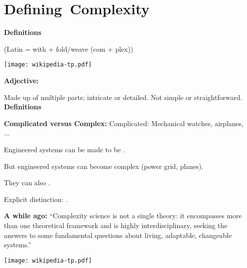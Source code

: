 

\section{Defining\ Complexity}
  \textbf{Definitions}

   (Latin = with + fold/weave (com + plex))
  \hfill
  
\begin{marginfigure}[]
\texttt{[image: wikipedia-tp.pdf]}
\end{marginfigure}


  \medskip

  \textbf{Adjective:}
    
     Made up of multiple parts; intricate or detailed.
     Not simple or straightforward.
  \textbf{Definitions}

  \textbf{Complicated versus Complex:}
      Complicated: Mechanical watches, airplanes, ...
     
      Engineered systems can be made to be .
    
      But engineered systems can become complex (power grid, planes).
     
      They can also .
     
      Explicit distinction: .

  \textbf{
      A while ago:
    }
    ``Complexity science is not a single theory: 
    it encompasses more than one theoretical framework and is highly
    interdisciplinary, seeking the answers to some fundamental questions
    about living, adaptable, changeable systems.''
  \textbf{
      \hfill 
    }   

      \begin{marginfigure}[]
\texttt{[image: wikipedia-tp.pdf]} 
\end{marginfigure}

